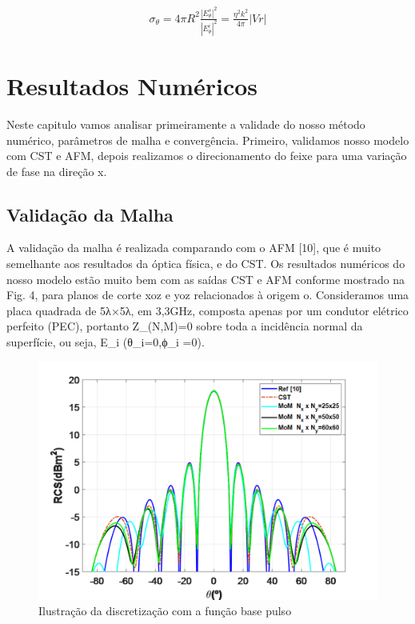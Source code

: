 \documentclass[
	12pt,				%
	openright,			%
	oneside,			%
	a4paper,			%
	english,			%
	brazil				%
	]{abntex2}
\begin{document}
 \begin{equation}
\begin{aligned}
\sigma_{\theta}=4\pi R^2\frac{|E_{\theta}^s|^2}{|E_{\theta}^{i}|^2}=
\frac{\eta^2 k^2}{4 \pi}|Vr|
   \end{aligned}
\end{equation}


\chapter{Resultados Numéricos}

Neste capitulo vamos analisar primeiramente a validade do nosso método numérico, parâmetros de malha e convergência. Primeiro, validamos nosso modelo com CST e AFM, depois realizamos o direcionamento do feixe para uma variação de fase na direção x.


\section{Validação da Malha}

A validação da malha é realizada comparando com o AFM [10], que é muito semelhante aos resultados da óptica física, e do CST. Os resultados numéricos do nosso modelo estão muito bem com as saídas CST e AFM conforme mostrado na Fig. 4, para planos de corte xoz e yoz relacionados à origem o. Consideramos uma placa quadrada de 5λ×5λ, em 3,3GHz, composta apenas por um condutor elétrico perfeito (PEC), portanto Z_(N,M)=0 sobre toda a incidência normal da superfície, ou seja, E_i (θ_i=0,ϕ_i =0).


\begin{figure}[htb]
 \label{DiscretizaçãoXY}
    \centering
    \caption{Ilustração da discretização  com a função base pulso} \label{fig_minipage}
    \includegraphics[width=\textwidth]{figures/RCSMeshValidationXoz.png}
  \hfill
\end{figure}
\end{document}
